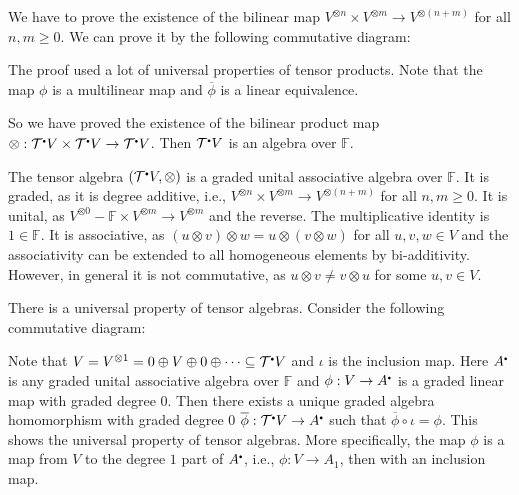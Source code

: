 \documentclass[
	11pt, %
	fleqn, %
	a4paper, %
]{LegrandOrangeBook}
\newcommand{\smallbullet}{\scalebox{0.5}{$\bullet$}}
\renewcommand{\bar}[1]{\overline{#1}} %
\newcommand{\F}{\mathbb{F}} %
\newcommand{\T}{\mathcal{T}^{\smallbullet}} %
\begin{document}
We have to prove the existence of the bilinear map $V^{\otimes n} \times V^{\otimes m} \to V^{\otimes (n + m)}$ for all $n, m \geq 0$. We can prove it by the following commutative diagram:
\begin{center}
\end{center}
The proof used a lot of universal properties of tensor products. Note that the map $\phi$ is a multilinear map and $\bar{\phi}$ is a linear equivalence.

So we have proved the existence of the bilinear product map $\otimes : \T V \times \T V \to \T V$. Then $\T V$ is an algebra over $\F$.
\begin{remark}
    The tensor algebra $(\T V, \otimes)$ is a graded unital associative algebra over $\F$. It is graded, as it is degree additive, i.e., $V^{\otimes n} \times V^{\otimes m} \to V^{\otimes (n + m)}$ for all $n, m \geq 0$. It is unital, as $V^{\otimes 0} - \F \times V^{\otimes m} \to V^{\otimes m}$ and the reverse. The multiplicative identity is $1 \in \F$. It is associative, as $(u \otimes v) \otimes w = u \otimes (v \otimes w)$ for all $u, v, w \in V$ and the associativity can be extended to all homogeneous elements by bi-additivity. However, in general it is not commutative, as $u \otimes v \neq v \otimes u$ for some $u, v \in V$.
\end{remark}

There is a universal property of tensor algebras. Consider the following commutative diagram:
\begin{center}
\end{center}
Note that $V = V^{\otimes 1} = 0 \oplus V \oplus 0 \oplus \cdots \subseteq \T V$ and $\iota$ is the inclusion map. Here $A^{\smallbullet}$ is any graded unital associative algebra over $\F$ and $\phi : V \to A^{\smallbullet}$ is a graded linear map with graded degree $0$. Then there exists a unique graded algebra homomorphism with graded degree $0$ $\bar{\phi} : \T V \to A^{\smallbullet}$ such that $\bar{\phi} \circ \iota = \phi$. This shows the universal property of tensor algebras. More specifically, the map $\phi$ is a map from $V$ to the degree $1$ part of $A^{\smallbullet}$, i.e., $\phi : V \to A_1$, then with an inclusion map.
\end{document}
